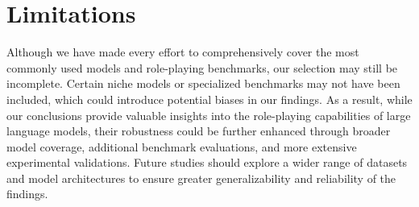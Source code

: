 \section*{Limitations}
Although we have made every effort to comprehensively cover the most commonly used models and role-playing benchmarks, our selection may still be incomplete. 
Certain niche models or specialized benchmarks may not have been included, which could introduce potential biases in our findings. 
As a result, while our conclusions provide valuable insights into the role-playing capabilities of large language models, their robustness could be further enhanced through broader model coverage, additional benchmark evaluations, and more extensive experimental validations. 
Future studies should explore a wider range of datasets and model architectures to ensure greater generalizability and reliability of the findings.